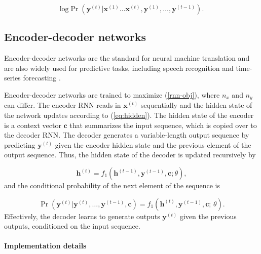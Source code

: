 \documentclass[hidelinks,12pt]{article}
\begin{document}
\begin{equation} \label{rnn-obj}
\text{log} \Pr \left(\boldsymbol{y}^{(t)} | \boldsymbol{x}^{(1)} \ldots \boldsymbol{x}^{(t)},\boldsymbol{y}^{(1)}, \ldots, \boldsymbol{y}^{(t-1)} \right).
\end{equation}

\subsection{Encoder-decoder networks}

Encoder-decoder networks are the standard for neural machine translation \citep{cho2014learning,bahdanau2014neural,vinyals2014grammar} and are also widely used for predictive tasks, including speech recognition \citep{chorowski2015attention} and time-series forecasting \citep{zhu2017deep}. 

Encoder-decoder networks are trained to maximize (\ref{rnn-obj}), where $n_x$ and $n_y$ can differ. The encoder RNN reads in $\boldsymbol{x}^{(t)}$ sequentially and the hidden state of the network updates according to (\ref{eq:hidden}). The hidden state of the encoder is a context vector $\boldsymbol{c}$ that summarizes the input sequence, which is copied over to the decoder RNN. The decoder generates a variable-length output sequence by predicting $\boldsymbol{y}^{(t)}$ given the encoder hidden state and the previous element of the output sequence. Thus, the hidden state of the decoder is updated recursively by

\begin{equation}
\boldsymbol{h}^{(t)} = f_1 \left( \boldsymbol{h}^{(t-1)}, \boldsymbol{y}^{(t-1)}, \boldsymbol{c}; \theta \right), \label{eq:decoder}
\end{equation} and the conditional probability of the next element of the sequence is 

\begin{equation}
\Pr (\boldsymbol{y}^{(t)} | \boldsymbol{y}^{(t)}, \ldots, \boldsymbol{y}^{(t-1)}, \boldsymbol{c}) =  f_1 \left( \boldsymbol{h}^{(t)}, \boldsymbol{y}^{(t-1)}, \boldsymbol{c}; \, \theta \right).
\end{equation}  Effectively, the decoder learns to generate outputs $\boldsymbol{y}^{(t)}$ given the previous outputs, conditioned on the input sequence. 

\paragraph{Implementation details} \label{imp-details}
\end{document}
